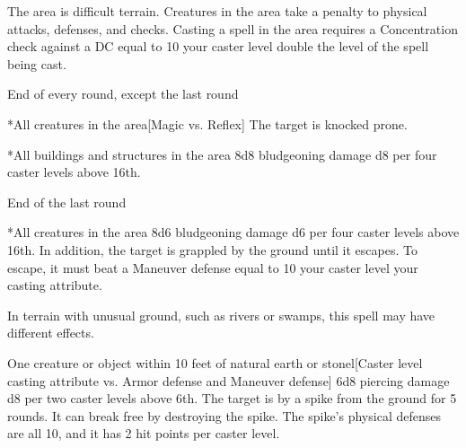 \spellline
\spelleffect The area is difficult terrain. Creatures in the area take a  penalty to physical attacks, defenses, and checks. Casting a spell in the area requires a Concentration check against a DC equal to 10 \add your caster level \add double the level of the spell being cast.
\begin{spelltrigger}{End of every round, except the last round}
    \begin{spelltarget}*{All creatures in the area}[Magic vs. Reflex]
        \spellsuccess The target is knocked prone.
    \end{spelltarget}
    \begin{spelltarget}*{All buildings and structures in the area}
        \spelleffect 8d8 bludgeoning damage \add d8 per four caster levels above 16th.
    \end{spelltarget}
\end{spelltrigger}
\begin{spelltrigger}{End of the last round}
    \begin{spelltarget}*{All creatures in the area}
        \spelleffect 8d6 bludgeoning damage \add d6 per four caster levels above 16th. In addition, the target is grappled by the ground until it escapes. To escape, it must beat a Maneuver defense equal to 10 \add your caster level \add your casting attribute.
    \end{spelltarget}
\end{spelltrigger}
\spellnotes In terrain with unusual ground, such as rivers or swamps, this spell may have different effects.

\spellrng{\rngmed}
\begin{spelltarget}{One creature or object within 10 feet of natural earth or stone}l[Caster level \add casting attribute vs. Armor defense and Maneuver defense]
     6d8 piercing damage \add d8 per two caster levels above 6th.
     The target is \immobilized by a spike from the ground for 5 rounds. It can break free by destroying the spike. The spike's physical defenses are all 10, and it has 2 hit points per caster level.
\end{spelltarget}

